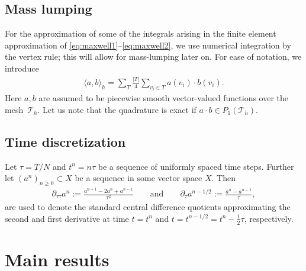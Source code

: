 \documentclass[12pt,reqno,a4paper]{amsart}
\theoremstyle{definition}
\def\Th{\mathcal{T}_h}
\def\dtautau{\partial_{\tau\tau}}
\def\dtau{\partial_{\tau}}
\def\Th{\mathcal{T}_h}
\def\la{\langle}
\def\ra{\rangle}
\begin{document}
\subsection*{Mass lumping}

For the approximation of some of the integrals arising in the finite element approximation of \eqref{eq:maxwell1}--\eqref{eq:maxwell2}, we use numerical integration by the vertex rule; this will allow for mass-lumping later on.
For ease of notation, we introduce
\begin{align}
\la a,b\ra_h = \sum\nolimits_T   \tfrac{|T|}{4} \sum\nolimits_{v_i \in T} a(v_i) \cdot b(v_i) . 
\end{align}
Here $a,b$ are assumed to be piecewise smooth vector-valued functions over the mesh~$\Th$.
Let us note that the quadrature is exact if $a \cdot b \in P_1(\Th)$.

\subsection*{Time discretization}
 
Let $\tau=T/N$ and $t^n = n \tau$ be a sequence of uniformly spaced time steps. Further let $(a^n)_{n \ge 0} \subset X$ be a sequence in some vector space $X$. Then 
\begin{align}
\dtautau a^n := \frac{a^{n+1} - 2 a^n + a^{n-1}}{\tau^2} 
\qquad \text{and} \qquad 
\dtau a^{n-1/2} := \frac{a^n-a^{n-1}}{\tau},
\end{align}
are used to denote the standard central difference quotients approximating the second and first derivative at time $t=t^n$ and $t=t^{n-1/2} = t^n-\frac{1}{2} \tau$, respectively.



\section{Main results}
\label{sec:main}
\end{document}
